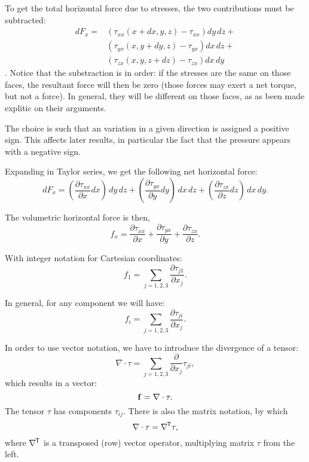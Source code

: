 To get the total horizontal force due to stresses, the two contributions
must be subtracted:
\begin{align*}
dF_x = 
&\left( \tau_{xx}(x+dx,y   ,z   ) - \tau_{xx} \right) dy\, dz + \\
&\left( \tau_{yx}(x   ,y+dy,z   ) - \tau_{yx} \right)  dx\, dz + \\
&\left( \tau_{zx}(x   ,y   ,z +dz  ) - \tau_{zx} \right) dx\, dy 
\end{align*}.
Notice that the substraction is in order: if the stresses are the same
on those faces, the resultant force will then be zero (those forces
may exert a net torque, but not a force).  In general, they will be
different on those faces, as as been made explitic on their arguments.

The choice is such that an variation in a given direction is assigned
a positive sign. This affects later results, in particular the fact
that the pressure appears with a negative sign.

Expanding in Taylor series, we get the following net horizontal force:
\[
 dF_x  =
 \left(\frac{\partial\tau_{xx}}{\partial x}  dx\right)\, dy\, dz
+\left(\frac{\partial\tau_{yx}}{\partial y}  dy\right)\, dx\, dz
+\left(\frac{\partial\tau_{zx}}{\partial z}  dz\right)\, dx\, dy .
\]

The volumetric horizontal force is then,
\[
f_x  =
 \frac{\partial\tau_{xx}}{\partial x}
+\frac{\partial\tau_{yx}}{\partial y}
+\frac{\partial\tau_{zx}}{\partial z} .
\]

With integer notation for Cartesian coordinates:
\[
 f_1  =
 \sum_{j=1,2,3}
 \frac{\partial\tau_{j1}}{\partial x_j} .
\]


In general, for any component we will have:
\[
 f_i  =
 \sum_{j=1,2,3}
  \frac{\partial\tau_{ji}}{\partial x_j} .
\]

In order to use vector notation, we have to introduce the
divergence of a tensor:
\[
\nabla \cdot \tau = \sum_{j=1,2,3}
  \frac{\partial}{\partial x_j}  \tau_{ji} ,
\]
 which results in a vector:
\[
 \mathbf{f}  =
 \nabla \cdot \tau .
\]
%
The tensor $\tau$ has components $\tau_{ij}$. There is also
the matrix notation, by which
\[
\nabla \cdot \tau = \nabla^{\mkern-1.5mu\mathsf{T}}  \tau ,
\]
where $\nabla^{\mkern-1.5mu\mathsf{T}}$ is a transposed (row) vector operator, multiplying
matrix $\tau$ from the left.

